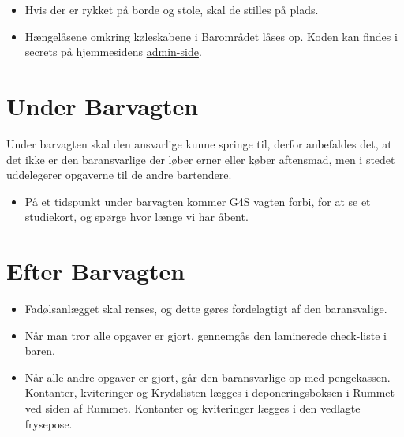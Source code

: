 \begin{itemize}
    \item Hvis der er rykket på borde og stole, skal de stilles på plads.
    \item Hængelåsene omkring køleskabene i Barområdet låses op. 
    Koden kan findes i secrets på hjemmesidens \href{https://fredagscafeen.dk/admin}{admin-side}.
\end{itemize}

\section{Under Barvagten}
\label{sec:intra-barvagten}
Under barvagten skal den ansvarlige kunne springe til, 
derfor anbefaldes det, at det ikke er den baransvarlige 
der løber erner eller køber aftensmad, men i stedet uddelegerer
opgaverne til de andre bartendere.
\begin{itemize}
    \item På et tidspunkt under barvagten kommer G4S vagten forbi, 
    for at se et studiekort, og spørge hvor længe vi har åbent.
\end{itemize}

\section{Efter Barvagten}
\label{sec:post-barvagten}

\begin{itemize}
    \item Fadølsanlægget skal renses, og dette gøres fordelagtigt af den baransvalige.
    \item Når man tror alle opgaver er gjort, gennemgås den laminerede check-liste i baren.
    \item Når alle andre opgaver er gjort, går den baransvarlige op med pengekassen. 
    Kontanter, kviteringer og Krydslisten lægges i deponeringsboksen i Rummet ved
    siden af Rummet. Kontanter og kviteringer lægges i den vedlagte frysepose.
\end{itemize}

\printindex


